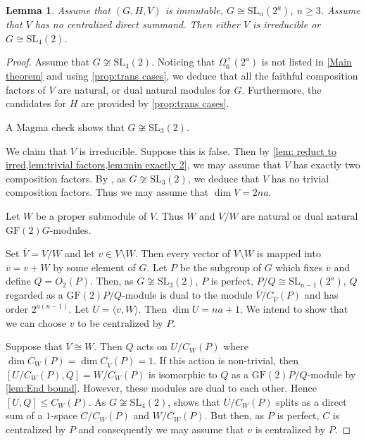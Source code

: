 \documentclass[12pt]{amsart}
\newtheorem{lemma}[theorem]{Lemma}
\theoremstyle{remark}
\theoremstyle{notation}
\theoremstyle{definition}
\newcommand{\GF}{\mathrm{GF}}
\newcommand{\SL}{\mathrm{SL}}
\newcommand{\0}{\emptyset}
\begin{document}
\begin{lemma}\label{lem:not linear}
Assume that $(G,H,V)$ is immutable, $G \cong \SL_{n}(2^a)$, $n \ge 3$. Assume that $V$ has no centralized direct summand. Then either $V$ is irreducible or $G \cong \SL_4(2)$.
\end{lemma}

\begin{proof} Assume that $G \not \cong \SL_4(2)$. Noticing that $\Omega^+_6(2^a)$ is not listed in \cref{Main theorem} and using \cref{prop:trans cases}, we deduce that all the faithful composition factors of $V$ are natural, or dual natural modules for $G$. Furthermore, the candidates for $H$ are provided by \cref{prop:trans cases}.

A {\sc Magma} check   shows that $G \not \cong \SL_3(2)$.


We claim   that $V$ is irreducible. Suppose this is false. Then by \cref{lem: reduct to irred,lem:trivial factors,lem:min exactly 2}, we may assume that $V$ has exactly two  composition factors. By  \cite[Tables B and C]{JonesParshall}, as  $G \not \cong \SL_3(2)$, we deduce that   $V$ has no trivial composition factors. Thus we may assume that $\dim V= 2na$.

Let $W$ be a proper submodule of $V$. Thus $ W$ and $V/W$ are natural or dual natural $\GF(2)G$-modules.


Set $\overline{V}= V/W$ and let $v \in V \setminus W$. Then every vector of $V \setminus W$ is mapped into $\overline v=v+W$ by some element of $G$.  Let $P$ be the subgroup of $G$ which fixes $\overline{v}$ and define $Q=O_2(P)$. Then, as $G \not \cong \SL_3(2)$, $P$ is perfect, $P/Q \cong \SL_{n-1}(2^a)$, $Q$ regarded as a $\GF(2)P/Q$-module is dual to the module $\overline{V}/C_{\overline V}(P)$ and has order $2^{a(n-1)}$. Let $U=\langle v,W\rangle$. Then $\dim U=na+1$. We intend to show that we can choose $v$ to be centralized by $P$.



Suppose that $\overline V \cong W$.  Then $Q$ acts on $U/C_W(P)$ where $\dim C_W(P)=\dim C_{\overline V}(P)=1$. If this action is non-trivial, then  $[U/C_W(P),Q]=W/C_W(P) $ is isomorphic to $Q$ as a $\GF(2)P/Q$-module by \cref{lem:End bound}. However, these modules are dual to each other. Hence $[U,Q]\le C_W(P)$.  As $G \not\cong \SL_4(2)$, \cite[Tables B and C]{JonesParshall} shows that   $U/C_W(P)$ splits as a direct sum of a $1$-space $C/C_W(P)$ and $W/C_W(P)$. But then, as $P$ is perfect, $C$ is centralized by $P$ and consequently we may assume that $v$ is centralized by $P$.


\end{proof}
\end{document}
